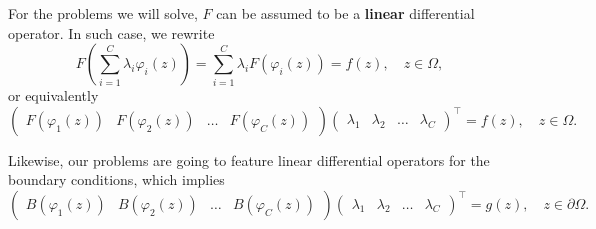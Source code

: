 \documentclass[12pt]{report} %
\newcommand{\tmstrong}[1]{\textbf{#1}}
\begin{document}
For the problems we will solve, $F$ can be assumed to be a {\tmstrong{linear}}
differential operator. In such case, we rewrite
\[ F \left( \sum_{i = 1}^C \lambda_i \varphi_i (z) \right) = \sum_{i = 1}^C
   \lambda_i F (\varphi_i (z)) = f (z), \quad z \in \Omega, \]
or equivalently
\[ \left(\begin{array}{cccc}
     F (\varphi_1 (z)) & F (\varphi_2 (z)) & \ldots & F (\varphi_C (z))
   \end{array}\right) \left(\begin{array}{cccc}
     \lambda_1 & \lambda_2 & \ldots & \lambda_C
   \end{array}\right)^{\top} = f (z), \quad z \in \Omega . \]

Likewise, our problems are going to feature linear differential operators for
the boundary conditions, which implies
\[ \left(\begin{array}{cccc}
     B (\varphi_1 (z)) & B (\varphi_2 (z)) & \ldots & B (\varphi_C (z))
   \end{array}\right) \left(\begin{array}{cccc}
     \lambda_1 & \lambda_2 & \ldots & \lambda_C
   \end{array}\right)^{\top} = g (z), \quad z \in \partial \Omega . \]
\end{document}
